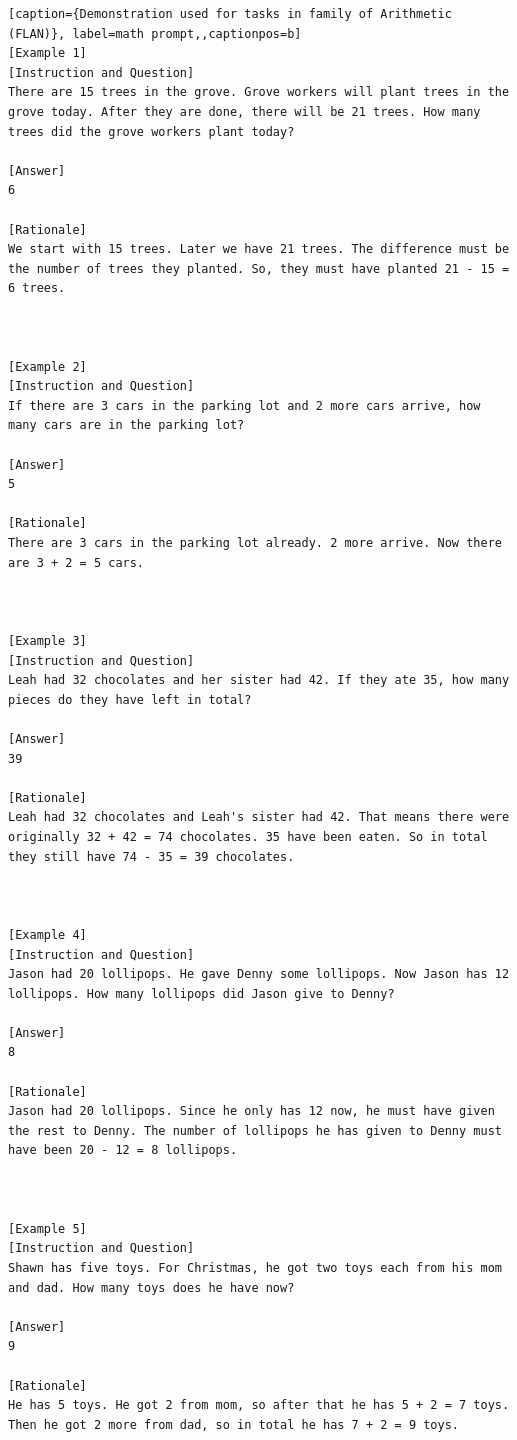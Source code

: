 \begin{lstlisting}[caption={Demonstration used for tasks in family of Arithmetic (FLAN)}, label=math prompt,,captionpos=b]
[Example 1]
[Instruction and Question] 
There are 15 trees in the grove. Grove workers will plant trees in the grove today. After they are done, there will be 21 trees. How many trees did the grove workers plant today?

[Answer]
6

[Rationale]
We start with 15 trees. Later we have 21 trees. The difference must be the number of trees they planted. So, they must have planted 21 - 15 = 6 trees.



[Example 2]
[Instruction and Question] 
If there are 3 cars in the parking lot and 2 more cars arrive, how many cars are in the parking lot?

[Answer] 
5

[Rationale]
There are 3 cars in the parking lot already. 2 more arrive. Now there are 3 + 2 = 5 cars. 



[Example 3]
[Instruction and Question] 
Leah had 32 chocolates and her sister had 42. If they ate 35, how many pieces do they have left in total?

[Answer] 
39

[Rationale]
Leah had 32 chocolates and Leah's sister had 42. That means there were originally 32 + 42 = 74 chocolates. 35 have been eaten. So in total they still have 74 - 35 = 39 chocolates. 



[Example 4]
[Instruction and Question] 
Jason had 20 lollipops. He gave Denny some lollipops. Now Jason has 12 lollipops. How many lollipops did Jason give to Denny?

[Answer] 
8

[Rationale]
Jason had 20 lollipops. Since he only has 12 now, he must have given the rest to Denny. The number of lollipops he has given to Denny must have been 20 - 12 = 8 lollipops. 



[Example 5]
[Instruction and Question] 
Shawn has five toys. For Christmas, he got two toys each from his mom and dad. How many toys does he have now?

[Answer] 
9

[Rationale]
He has 5 toys. He got 2 from mom, so after that he has 5 + 2 = 7 toys. Then he got 2 more from dad, so in total he has 7 + 2 = 9 toys. 




\end{lstlisting}
